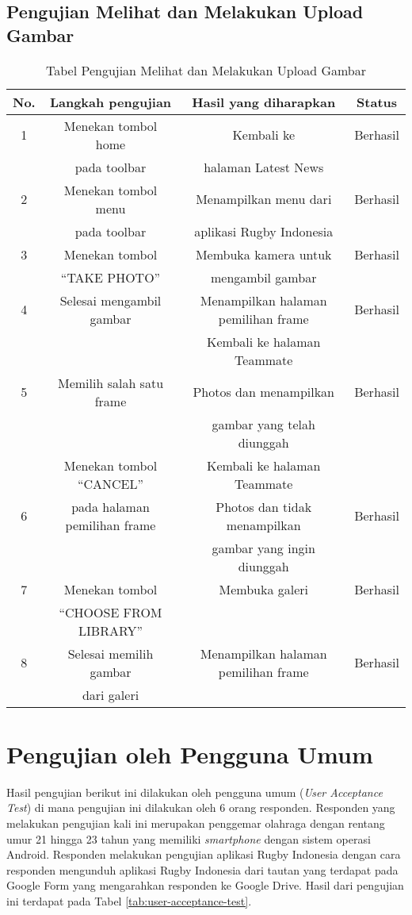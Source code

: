 \subsection{Pengujian Melihat dan Melakukan Upload Gambar}
\begin{table} [H]
    \centering
    \caption{Tabel Pengujian Melihat dan Melakukan Upload Gambar}
    \begin{tabular}{|c|c|c|c|}
    \hline
       No. & Langkah pengujian & Hasil yang diharapkan & Status  \\ \hline
        1 & Menekan tombol home & Kembali ke & Berhasil \\
         & pada toolbar & halaman Latest News &  \\ \hline
     2 & Menekan tombol menu & Menampilkan menu dari & Berhasil \\
     & pada toolbar & aplikasi Rugby Indonesia &  \\ \hline
     3 & Menekan tombol & Membuka kamera untuk & Berhasil \\
     & ``TAKE PHOTO'' & mengambil gambar &  \\ \hline
     4 & Selesai mengambil gambar & Menampilkan halaman pemilihan frame & Berhasil \\ \hline
      &  & Kembali ke halaman Teammate &  \\
    5 & Memilih salah satu frame &  Photos dan menampilkan  & Berhasil \\
     &  &  gambar yang telah diunggah &  \\ \hline
      & Menekan tombol ``CANCEL'' & Kembali ke halaman Teammate  &  \\
   6 & pada halaman pemilihan frame & Photos dan tidak menampilkan  & Berhasil \\
     &  & gambar yang ingin diunggah &  \\ \hline
     7 & Menekan tombol & Membuka galeri & Berhasil \\
     & ``CHOOSE FROM LIBRARY'' &  &  \\ \hline
     8 & Selesai memilih gambar & Menampilkan halaman pemilihan frame & Berhasil \\
     & dari galeri &  &  \\ \hline
    \end{tabular}
    \label{tab:view-and-upload-image-test}
\end{table}

\section{Pengujian oleh Pengguna Umum}
Hasil pengujian berikut ini dilakukan oleh pengguna umum (\textit{User Acceptance Test}) di mana pengujian ini dilakukan oleh 6 orang responden. Responden yang melakukan pengujian kali ini merupakan penggemar olahraga dengan rentang umur 21 hingga 23 tahun yang memiliki \textit{smartphone} dengan sistem operasi Android. Responden melakukan pengujian aplikasi Rugby Indonesia dengan cara responden mengunduh aplikasi Rugby Indonesia dari tautan yang terdapat pada Google Form yang mengarahkan responden ke Google Drive. Hasil dari pengujian ini terdapat pada Tabel \ref{tab:user-acceptance-test}.

